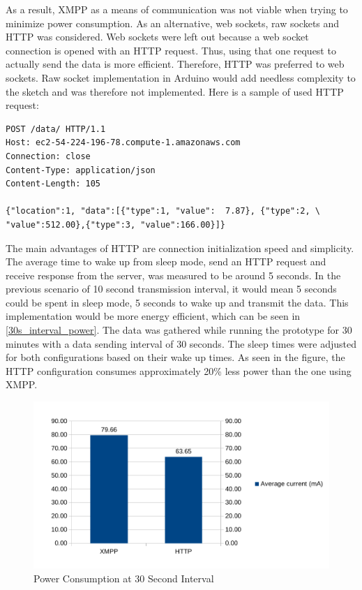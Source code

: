 As a result, XMPP as a means of communication was not viable when trying to minimize power consumption. As an alternative, web sockets, raw sockets and HTTP was considered. Web sockets were left out because a web socket connection is opened with an HTTP request. Thus, using that one request to actually send the data is more efficient. Therefore, HTTP was preferred to web sockets. Raw socket implementation in Arduino would add needless complexity to the sketch and was therefore not implemented. Here is a sample of used HTTP request:

\begin{lstlisting}
POST /data/ HTTP/1.1
Host: ec2-54-224-196-78.compute-1.amazonaws.com
Connection: close
Content-Type: application/json
Content-Length: 105

{"location":1, "data":[{"type":1, "value":  7.87}, {"type":2, \
"value":512.00},{"type":3, "value":166.00}]}
\end{lstlisting}

The main advantages of HTTP are connection initialization speed and simplicity. The average time to wake up from sleep mode, send an HTTP request and receive response from the server, was measured to be around 5 seconds. In the previous scenario of 10 second transmission interval, it would mean 5 seconds could be spent in sleep mode, 5 seconds to wake up and transmit the data. This implementation would be more energy efficient, which can be seen in \autoref{30s_interval_power}. The data was gathered while running the prototype for 30 minutes with a data sending interval of 30 seconds. The sleep times were adjusted for both configurations based on their wake up times. As seen in the figure, the HTTP configuration consumes approximately 20\% less power than the one using XMPP.

\begin{figure}[h]
\centering
\includegraphics[scale=0.85]{4/figures/30s_xmpp_vs_http.pdf}
\caption{Power Consumption at 30 Second Interval}
\label{30s_interval_power}
\end{figure}

